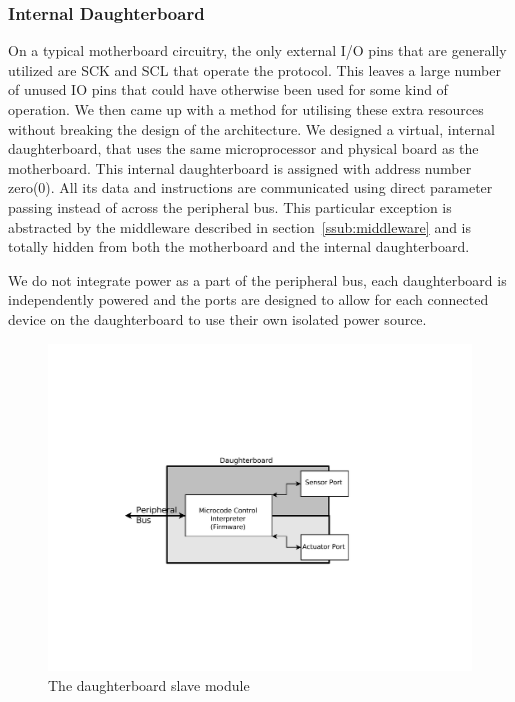	\subsubsection{Internal Daughterboard} %
	\label{ssub:internal_daughterboard}
	
	On a typical motherboard circuitry, the only external I/O pins that are generally utilized are SCK and SCL that operate the \iic protocol. This leaves a large number of unused IO pins that could have otherwise been used for some kind of operation. We then came up with a method for utilising these extra resources without breaking the design of the architecture. We designed a virtual, internal daughterboard, that uses the same microprocessor and physical board as the motherboard. This internal daughterboard is assigned with address number zero(0). All its data and instructions are communicated using direct parameter passing instead of across the peripheral bus. This particular exception is abstracted by the middleware described in section~\ref{ssub:middleware} and is totally hidden from both the motherboard and the internal daughterboard.

	We do not integrate power as a part of the peripheral bus, each daughterboard is independently powered and the ports are designed to allow for each connected device on the daughterboard to use their own isolated power source.
	
	\begin{figure}[h]
	  \begin{center}
	    \includegraphics[width=1.0\columnwidth]{Figures/db.pdf}
	    \caption{The daughterboard slave module}
	  \end{center}
	\end{figure}
	
